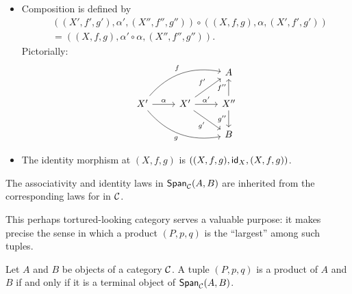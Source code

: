\begin{definition}
\begin{itemize}
\item Composition is defined by
  \begin{align}
    &((X',f',g'),\alpha',(X'',f'',g''))\circ ((X,f,g),\alpha,(X',f',g'))\\
    &= ((X,f,g),\alpha'\circ \alpha,(X'',f'',g'')).
  \end{align}
  Pictorially:
  \begin{equation}
\begin{tikzcd}
                                                                                 &                                                            & A                                      \\
X' \arrow[rru, "f", bend left] \arrow[rrd, "g"', bend right] \arrow[r, "\alpha"] & X' \arrow[r, "\alpha'"] \arrow[ru, "f'"] \arrow[rd, "g'"'] & X'' \arrow[u, "f''"] \arrow[d, "g''"'] \\
                                                                                 &                                                            & B
\end{tikzcd}
  \end{equation}

  \item The identity morphism at \((X,f,g)\) is \(((X,f,g),\mathsf{id}_{X},(X,f,g))\).
\end{itemize}
The associativity and identity laws in \(\mathsf{Span}_\mathcal C(A,B)\)
are inherited from the corresponding laws for in \(\mathcal C\).
\end{definition}

This perhaps tortured-looking category serves a valuable purpose:
it makes precise the sense in which a product \((P,p,q)\)
is the ``largest'' among such tuples.

\begin{proposition}
  Let \(A\) and \(B\) be objects of a category \(\mathcal C\).
  A tuple \((P,p,q)\) is a product of \(A\) and \(B\)
  if and only if it is a terminal object of \(\mathsf{Span}_\mathcal C(A,B)\).
\end{proposition}

